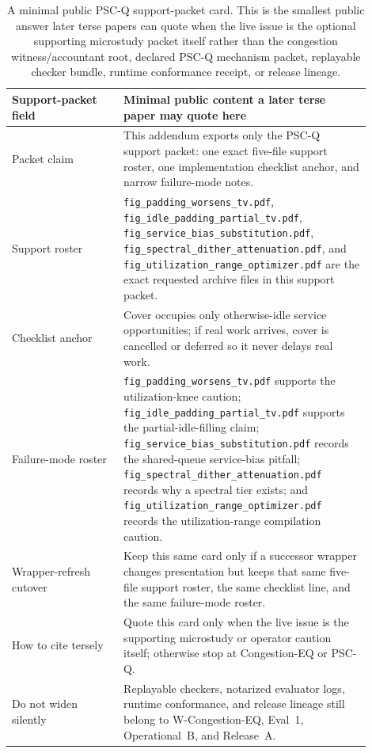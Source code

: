 \documentclass[11pt]{article}
\theoremstyle{definition}
\theoremstyle{remark}
\begin{document}
\begin{table}[t]
\centering
\begin{tabular}{@{}p{0.28\linewidth}p{0.62\linewidth}@{}}
\toprule
Support-packet field & Minimal public content a later terse paper may quote here \\
\midrule
Packet claim & This addendum exports only the PSC-Q support packet: one exact five-file support roster, one implementation checklist anchor, and narrow failure-mode notes. \\
Support roster & \texttt{fig\_padding\_worsens\_tv.pdf}, \texttt{fig\_idle\_padding\_partial\_tv.pdf}, \texttt{fig\_service\_bias\_substitution.pdf}, \texttt{fig\_spectral\_dither\_attenuation.pdf}, and \texttt{fig\_utilization\_range\_optimizer.pdf} are the exact requested archive files in this support packet. \\
Checklist anchor & Cover occupies only otherwise-idle service opportunities; if real work arrives, cover is cancelled or deferred so it never delays real work. \\
Failure-mode roster & \texttt{fig\_padding\_worsens\_tv.pdf} supports the utilization-knee caution; \texttt{fig\_idle\_padding\_partial\_tv.pdf} supports the partial-idle-filling claim; \texttt{fig\_service\_bias\_substitution.pdf} records the shared-queue service-bias pitfall; \texttt{fig\_spectral\_dither\_attenuation.pdf} records why a spectral tier exists; and \texttt{fig\_utilization\_range\_optimizer.pdf} records the utilization-range compilation caution. \\
Wrapper-refresh cutover & Keep this same card only if a successor wrapper changes presentation but keeps that same five-file support roster, the same checklist line, and the same failure-mode roster. \\
How to cite tersely & Quote this card only when the live issue is the supporting microstudy or operator caution itself; otherwise stop at Congestion-EQ or PSC-Q. \\
Do not widen silently & Replayable checkers, notarized evaluator logs, runtime conformance, and release lineage still belong to W-Congestion-EQ, Eval~1, Operational~B, and Release~A. \\
\bottomrule
\end{tabular}
\caption{A minimal public PSC-Q support-packet card. This is the smallest public answer later terse papers can quote when the live issue is the optional supporting microstudy packet itself rather than the congestion witness/accountant root, declared PSC-Q mechanism packet, replayable checker bundle, runtime conformance receipt, or release lineage.}
\label{tab:pscq-addendum-card}
\end{table}
\end{document}
